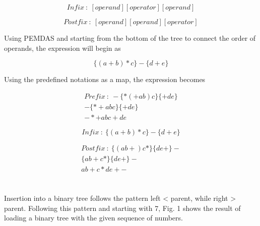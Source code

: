 \documentclass[journal]{IEEEtran}
\begin{document}
\begin{equation}
    Infix~:~[operand][operator][operand]
\end{equation}

\begin{equation}
    Postfix~:~[operand][operand][operator]
\end{equation}

Using PEMDAS and starting from the bottom of the tree to connect the order of 
operands, the expression will begin as 

\begin{equation}
    \{(a+b)*c\} - \{d+e\}
\end{equation}

Using the predefined notations as a map, the expression becomes

\begin{equation}
    \begin{split}
    Prefix~:~-\{*(+ab)c\}\{+de\} \\
    -\{*+abc\}\{+de\} \\
    \boxed{-*+abc+de}
    \end{split}
\end{equation}

\begin{equation}
    Infix~:~\boxed{\{(a+b)*c\} - \{d+e\}}
\end{equation}

\begin{equation}
    \begin{split}
    Postfix~:~\{(ab+)c*\}\{de+\}- \\
    \{ab+c*\}\{de+\}- \\
    \boxed{ab+c*de+-}
    \end{split}
\end{equation}

\section{}

Insertion into a binary tree follows the pattern left < parent, while right > parent.  
Following this pattern and starting with 7, Fig. 1 shows the result of loading a binary
tree with the given sequence of numbers.
\end{document}
